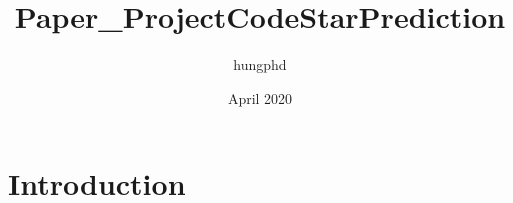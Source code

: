 \documentclass{article}
\title{Paper_ProjectCodeStarPrediction}
\author{hungphd }
\date{April 2020}
\begin{document}
\maketitle

\section{Introduction}
\end{document}
